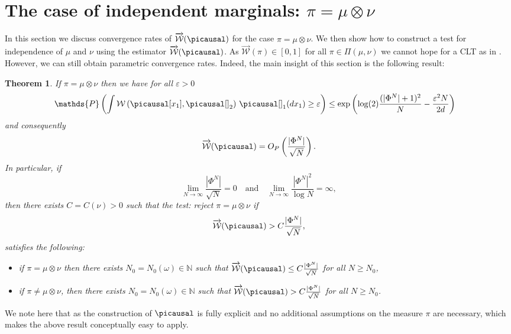 \documentclass[10pt]{amsart}
\newtheorem{theorem}{Theorem}[section]
\newcommand{\N}{\mathbb{N}}
\renewcommand{\P}{\mathds{P}}
\renewcommand{\epsilon}{\varepsilon}
\begin{document}
\section{The case of independent marginals: $\pi=\mu\otimes\nu$}\label{sec:4}

In this section we discuss convergence rates of $\overrightarrow{\mathcal{W}}(\picausal)$ for the case $\pi=\mu\otimes\nu$. We then show how to construct a test for independence of $\mu$ and $\nu$ using the estimator $\overrightarrow{\mathcal{W}}(\picausal)$. As $\overrightarrow{\mathcal{W}}(\pi)\in [0,1]$ for all $\pi\in \Pi(\mu,\nu)$ we cannot hope for a CLT as in \cite[Theorem 4.1]{deb2020kernel}. However, we can still obtain parametric convergence rates. Indeed, the main insight of this section is the following result:

\begin{theorem}\label{thm:test1}
If $\pi=\mu\otimes \nu$ then we have for all $\epsilon>0$
\begin{align*}
\P\left( \int \mathcal{W}\left(\picausal[x_1],\picausal[]_2\right)\,\picausal[]_1(dx_1) \ge \epsilon\right)&\le \exp\left( \log(2) \frac{(|\Phi^N|+1)^2}{N}-\frac{\varepsilon^{2}N}{ 2d}\right)
\end{align*}
and consequently 
\begin{align*}
\overrightarrow{\mathcal{W}}(\picausal) =O_P\left(\frac{|\Phi^N|}{\sqrt{N}}\right).
\end{align*}
In particular, if $$\lim_{N\to \infty} \frac{|\Phi^N|}{\sqrt{N}}=0\quad \text{and}\quad \lim_{N\to \infty} \frac{|\Phi^N|^2}{\log N}=\infty,$$ then there exists $C=C(\nu)>0$ such that the test: reject $\pi=\mu\otimes \nu$ if
\begin{align*}
\overrightarrow{\mathcal{W}}(\picausal)> C \frac{|\Phi^N|}{\sqrt{N}},
\end{align*}
satisfies the following:
\begin{itemize}
\item if $\pi=\mu\otimes \nu$ then there exists $N_0=N_0(\omega)\in \N$ such that $\overrightarrow{\mathcal{W}}(\picausal)\le C \frac{|\Phi^N|}{\sqrt{N}}$ for all $N\ge N_0$,
\item if $\pi\neq \mu\otimes \nu$, then there exists $N_0=N_0(\omega)\in \N$ such that $\overrightarrow{\mathcal{W}}(\picausal)> C \frac{|\Phi^N|}{\sqrt{N}}$ for all $N\ge N_0$.
\end{itemize}
\end{theorem}

We note here that as the construction of $\picausal$ is fully explicit and no additional assumptions on the measure $\pi$ are necessary, which makes the above result conceptually easy to apply.\\
\end{document}
